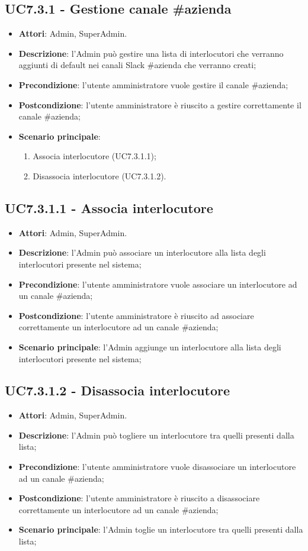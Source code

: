 \documentclass[../AnalisiDeiRequisiti_v3.0.0.tex]{subfiles}
\begin{document}
\subsection{UC7.3.1 - Gestione canale \#azienda} 
\label{sssec:UC7.3.1} 
\begin{itemize} 
\item \textbf{Attori}: Admin, SuperAdmin.
\item \textbf{Descrizione}: l'Admin può gestire una lista di interlocutori che verranno aggiunti di default nei canali Slack \#azienda che verranno creati;
\item \textbf{Precondizione}: l'utente amministratore vuole gestire il canale \#azienda;
\item \textbf{Postcondizione}: l'utente amministratore è riuscito a gestire correttamente il canale \#azienda;
\item \textbf{Scenario principale}: \begin{enumerate}\item Associa interlocutore (UC7.3.1.1);\item Disassocia interlocutore (UC7.3.1.2). 
 \end{enumerate}
\end{itemize} 
\subsection{UC7.3.1.1 - Associa interlocutore} 
\label{sssec:UC7.3.1.1} 
\begin{itemize} 
\item \textbf{Attori}: Admin, SuperAdmin.
\item \textbf{Descrizione}: l'Admin può associare un interlocutore alla lista degli interlocutori presente nel sistema;
\item \textbf{Precondizione}: l'utente amministratore vuole associare un interlocutore ad un canale \#azienda;
\item \textbf{Postcondizione}: l'utente amministratore è riuscito ad associare correttamente un interlocutore ad un canale \#azienda;
\item \textbf{Scenario principale}: l'Admin aggiunge un interlocutore alla lista degli interlocutori presente nel sistema;
\end{itemize} 
\subsection{UC7.3.1.2 - Disassocia interlocutore} 
\label{sssec:UC7.3.1.2} 
\begin{itemize} 
\item \textbf{Attori}: Admin, SuperAdmin.
\item \textbf{Descrizione}: l'Admin può togliere un interlocutore tra quelli presenti dalla lista;
\item \textbf{Precondizione}: l'utente amministratore vuole disassociare un interlocutore ad un canale \#azienda;
\item \textbf{Postcondizione}: l'utente amministratore è riuscito a disassociare correttamente un interlocutore ad un canale \#azienda;
\item \textbf{Scenario principale}: l'Admin toglie un interlocutore tra quelli presenti dalla lista;
\end{itemize} 
\end{document}
